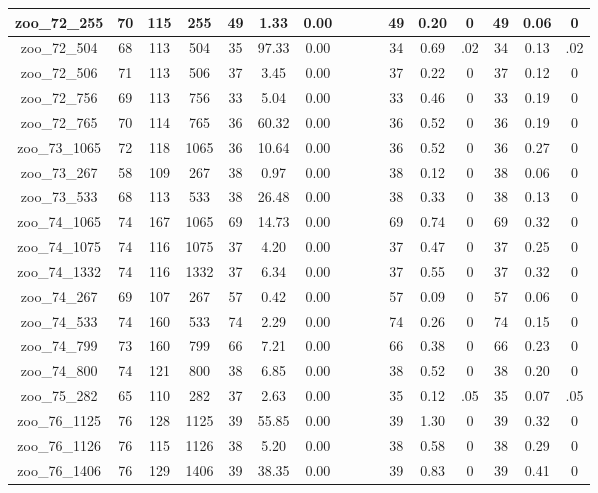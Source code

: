 \begin{landscape}
\begin{longtable}{|c|c|c|c|c|c|c|c|c|c|c|c|c|c|c|c|}
zoo\_72\_255 & 70 & 115 & 255 & 49 & 1.33 & 0.00 &  &  &  & 49 & 0.20 & 0 & 49 & 0.06 & 0 \\ \hline 
zoo\_72\_504 & 68 & 113 & 504 & 35 & 97.33 & 0.00 &  &  &  & 34 & 0.69 & .02 & 34 & 0.13 & .02 \\ \hline 
zoo\_72\_506 & 71 & 113 & 506 & 37 & 3.45 & 0.00 &  &  &  & 37 & 0.22 & 0 & 37 & 0.12 & 0 \\ \hline 
zoo\_72\_756 & 69 & 113 & 756 & 33 & 5.04 & 0.00 &  &  &  & 33 & 0.46 & 0 & 33 & 0.19 & 0 \\ \hline 
zoo\_72\_765 & 70 & 114 & 765 & 36 & 60.32 & 0.00 &  &  &  & 36 & 0.52 & 0 & 36 & 0.19 & 0 \\ \hline 
zoo\_73\_1065 & 72 & 118 & 1065 & 36 & 10.64 & 0.00 &  &  &  & 36 & 0.52 & 0 & 36 & 0.27 & 0 \\ \hline 
zoo\_73\_267 & 58 & 109 & 267 & 38 & 0.97 & 0.00 &  &  &  & 38 & 0.12 & 0 & 38 & 0.06 & 0 \\ \hline 
zoo\_73\_533 & 68 & 113 & 533 & 38 & 26.48 & 0.00 &  &  &  & 38 & 0.33 & 0 & 38 & 0.13 & 0 \\ \hline 
zoo\_74\_1065 & 74 & 167 & 1065 & 69 & 14.73 & 0.00 &  &  &  & 69 & 0.74 & 0 & 69 & 0.32 & 0 \\ \hline 
zoo\_74\_1075 & 74 & 116 & 1075 & 37 & 4.20 & 0.00 &  &  &  & 37 & 0.47 & 0 & 37 & 0.25 & 0 \\ \hline 
zoo\_74\_1332 & 74 & 116 & 1332 & 37 & 6.34 & 0.00 &  &  &  & 37 & 0.55 & 0 & 37 & 0.32 & 0 \\ \hline 
zoo\_74\_267 & 69 & 107 & 267 & 57 & 0.42 & 0.00 &  &  &  & 57 & 0.09 & 0 & 57 & 0.06 & 0 \\ \hline 
zoo\_74\_533 & 74 & 160 & 533 & 74 & 2.29 & 0.00 &  &  &  & 74 & 0.26 & 0 & 74 & 0.15 & 0 \\ \hline 
zoo\_74\_799 & 73 & 160 & 799 & 66 & 7.21 & 0.00 &  &  &  & 66 & 0.38 & 0 & 66 & 0.23 & 0 \\ \hline 
zoo\_74\_800 & 74 & 121 & 800 & 38 & 6.85 & 0.00 &  &  &  & 38 & 0.52 & 0 & 38 & 0.20 & 0 \\ \hline 
zoo\_75\_282 & 65 & 110 & 282 & 37 & 2.63 & 0.00 &  &  &  & 35 & 0.12 & .05 & 35 & 0.07 & .05 \\ \hline 
zoo\_76\_1125 & 76 & 128 & 1125 & 39 & 55.85 & 0.00 &  &  &  & 39 & 1.30 & 0 & 39 & 0.32 & 0 \\ \hline 
zoo\_76\_1126 & 76 & 115 & 1126 & 38 & 5.20 & 0.00 &  &  &  & 38 & 0.58 & 0 & 38 & 0.29 & 0 \\ \hline 
zoo\_76\_1406 & 76 & 129 & 1406 & 39 & 38.35 & 0.00 &  &  &  & 39 & 0.83 & 0 & 39 & 0.41 & 0 \\ \hline 

\end{longtable}
\end{landscape}
